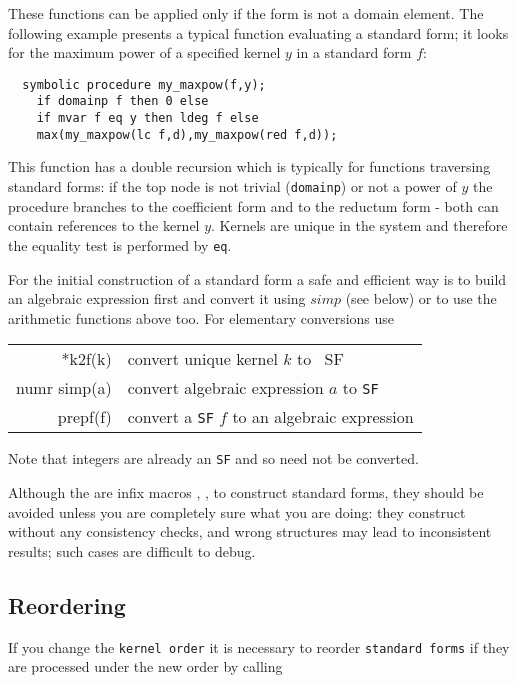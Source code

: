 These functions can be applied only if the form
is not a domain element. The following example presents
a typical function evaluating a standard form; it looks for the
maximum power of a specified kernel $y$ in a standard form $f$:

\begin{verbatim}
  symbolic procedure my_maxpow(f,y);
    if domainp f then 0 else
    if mvar f eq y then ldeg f else
    max(my_maxpow(lc f,d),my_maxpow(red f,d));
\end{verbatim}

This function has a double recursion which is typically
for functions traversing standard forms: if the top node is
not trivial ({\tt domainp}) or not a power of $y$ 
the procedure branches to the
coefficient form and to the reductum form - both
can contain references to the kernel $y$. Kernels are
unique in the system and therefore the equality test is
performed by {\tt eq}.

For the initial construction of a standard form a safe and efficient
way is to build an algebraic expression first and convert
it using $simp$ (see below) or to use the arithmetic functions 
above too. For elementary conversions use

\begin{center}
\begin{tabular}{|r|l|} \hline
    *k2f(k) &  convert unique kernel $k$ to {\ SF} \\ 
    numr simp(a)& convert algebraic expression $a$ to {\tt SF}\\
    prepf(f)& convert a {\tt SF} $f$ to an algebraic expression\\ 
\hline
\end{tabular}
\end{center}
Note that integers are already an {\tt SF} and so need not be converted.
    
Although the are infix macros  ,  ,  to
construct standard forms, they should be avoided unless
you are completely sure what you are doing: they construct
without any consistency checks, and wrong structures may lead
to inconsistent results; such cases are difficult to debug.

\subsection{Reordering}

If you change the {\tt kernel order} it is 
necessary to reorder {\tt standard forms} if they
are processed under the new order by calling

